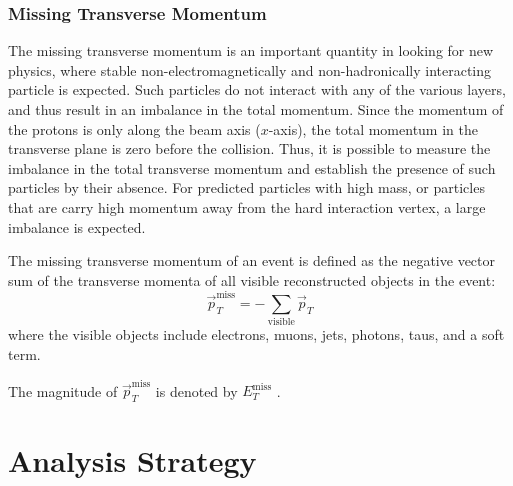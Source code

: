 \documentclass[12pt,a4paper,openright,twoside]{report}
\newcommand{\met}{$E_T^{\mathrm{miss}}$ }
\begin{document}
\subsection{Missing Transverse Momentum}
The missing transverse momentum is an important quantity in looking for new physics, where stable non-electromagnetically and non-hadronically interacting particle is expected. Such particles do not interact with any of the various layers, and thus result in an imbalance in the total momentum. Since the momentum of the protons is only along the beam axis ($x$-axis), the total momentum in the transverse plane is zero before the collision. Thus, it is possible to measure the imbalance in the total transverse momentum and establish the presence of such particles by their absence. For predicted particles with high mass, or particles that are carry high momentum away from the hard interaction vertex, a large imbalance is expected.

The missing transverse momentum of an event is defined as the negative vector sum of the transverse momenta of all visible reconstructed objects in the event:
\begin{equation}
\vec{p}_T^{\mathrm{miss}} = -\sum_{\mathrm{visible}}\vec{p}_T
\end{equation}
where the visible objects include electrons, muons, jets, photons, taus, and a soft term.

The magnitude of $\vec{p}_T^{\mathrm{miss}}$ is denoted by \met.

\chapter{Analysis Strategy}\label{ch:theory}
\end{document}
